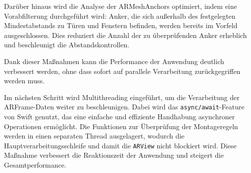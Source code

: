 Darüber hinaus wird die Analyse der ARMeshAnchors optimiert, indem eine Vorabfilterung durchgeführt wird: Anker, die sich außerhalb des festgelegten Mindestabstands zu Türen und Fenstern befinden, werden bereits im Vorfeld ausgeschlossen. Dies reduziert die Anzahl der zu überprüfenden Anker erheblich und beschleunigt die Abstandskontrollen.

Dank dieser Maßnahmen kann die Performance der Anwendung deutlich verbessert werden, ohne dass sofort auf parallele Verarbeitung zurückgegriffen werden muss.

Im nächsten Schritt wird Multithreading eingeführt, um die Verarbeitung der ARFrame-Daten weiter zu beschleunigen. Dabei wird das \texttt{async/await}-Feature von Swift genutzt, das eine einfache und effiziente Handhabung asynchroner Operationen ermöglicht. Die Funktionen zur Überprüfung der Montageregeln werden in einen separaten Thread ausgelagert, wodurch die Hauptverarbeitungsschleife und damit die \texttt{ARView} nicht blockiert wird. Diese Maßnahme verbessert die Reaktionszeit der Anwendung und steigert die Gesamtperformance.